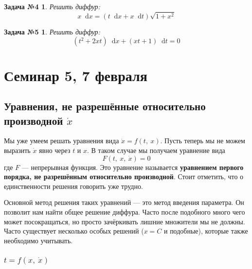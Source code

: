 \documentclass[a4paper,12pt]{article}
\newtheorem*{task4}{Задача №4}
\newtheorem*{task5}{Задача №5}
\renewcommand*\d{\mathop{}\!\mathrm{d}}
\newcommand{\dx}{\dot{x}}
\begin{document}
\begin{task4}
	Решить диффур:
	\[x\d x = (t \d x + x \d t) \sqrt{1 + x^2}\]
\end{task4}
%

\begin{task5}
	Решить диффур:
	\[(t^2 + 2xt)\d x + (xt + 1)\d t = 0\]
\end{task5}
%	

\newpage
\section{Семинар 5, 7 февраля}

\subsection{Уравнения, не разрешённые относительно производной $\dx$}

Мы уже умеем решать уравнения вида $\dx = f(t,\ x)$. Пусть теперь мы не можем выразить $\dx$ явно через $t$ и $x$. В таком случае мы получаем уравнение вида
\[F(t,\ x,\ \dx) = 0\] где $F$ --- непрерывная функция. Это уравнение называется \textbf{уравнением первого порядка, не разрешённым относительно производной}. Стоит отметить, что о единственности решения говорить уже трудно.

Основной метод решения таких уравнений --- это метод введения параметра. Он позволит нам найти общее решение диффура. Часто после подобного много чего может посокращаться, но просто зачёркивать лишние множители мы не должны. Часто существует несколько особых решений ($x = C$ и подобные), которые также необходимо учитывать. 

\subsubsection{$t = f(x,\ \dx)$}
\end{document}
